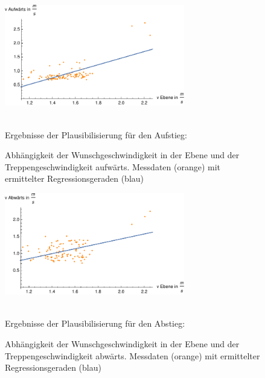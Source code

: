 \begin{figure}[htpb]
\centering
\includegraphics[width=0.7\textwidth]{abbildungen/regression/2012_2017_verbund/auf-ebene.pdf}
\caption{Abhängigkeit der Wunschgeschwindigkeit in der Ebene und der Treppengeschwindigkeit aufwärts. Messdaten (orange) mit ermittelter Regressionsgeraden (blau)}
\label{fig:2012_und_2017_MA_auf_ebene}
\justify \ \\
Ergebnisse der Plausibilisierung für den Aufstieg:

\end{figure}

\begin{figure}[htpb]
\centering
\includegraphics[width=0.7\textwidth]{abbildungen/regression/2012_2017_verbund/ab-ebene.pdf}
\caption{Abhängigkeit der Wunschgeschwindigkeit in der Ebene und der Treppengeschwindigkeit abwärts. Messdaten (orange) mit ermittelter Regressionsgeraden (blau)}
\label{fig:2012_und_2017_MA_ab_ebene}
\justify \ \\
Ergebnisse der Plausibilisierung für den Abstieg:

\end{figure}

